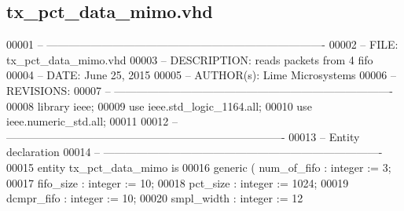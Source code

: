 \subsection{tx\+\_\+pct\+\_\+data\+\_\+mimo.\+vhd}
\label{tx__pct__data__mimo_8vhd_source}

\begin{DoxyCode}
00001 \textcolor{keyword}{-- ---------------------------------------------------------------------------- }
00002 \textcolor{keyword}{-- FILE:    tx\_pct\_data\_mimo.vhd}
00003 \textcolor{keyword}{-- DESCRIPTION: reads packets from 4 fifo}
00004 \textcolor{keyword}{-- DATE:    June 25, 2015}
00005 \textcolor{keyword}{-- AUTHOR(s):   Lime Microsystems}
00006 \textcolor{keyword}{-- REVISIONS:}
00007 \textcolor{keyword}{-- ---------------------------------------------------------------------------- }
00008 \textcolor{vhdlkeyword}{library }\textcolor{keywordflow}{ieee};
00009 \textcolor{vhdlkeyword}{use }ieee.std\_logic\_1164.\textcolor{keywordflow}{all};
00010 \textcolor{vhdlkeyword}{use }ieee.numeric\_std.\textcolor{keywordflow}{all};
00011 
00012 \textcolor{keyword}{-- ----------------------------------------------------------------------------}
00013 \textcolor{keyword}{-- Entity declaration}
00014 \textcolor{keyword}{-- ----------------------------------------------------------------------------}
00015 \textcolor{keywordflow}{entity }tx_pct_data_mimo \textcolor{keywordflow}{is}
00016   \textcolor{keywordflow}{generic} \textcolor{vhdlchar}{(} \textcolor{vhdlchar}{num_of_fifo} \textcolor{vhdlchar}{:} \textcolor{comment}{integer} \textcolor{vhdlchar}{:=} \textcolor{vhdllogic}{}\textcolor{vhdllogic}{3};
00017             \textcolor{vhdlchar}{fifo_size}   \textcolor{vhdlchar}{:} \textcolor{comment}{integer} \textcolor{vhdlchar}{:=} \textcolor{vhdllogic}{}\textcolor{vhdllogic}{10};
00018             \textcolor{vhdlchar}{pct_size}    \textcolor{vhdlchar}{:} \textcolor{comment}{integer} \textcolor{vhdlchar}{:=} \textcolor{vhdllogic}{}\textcolor{vhdllogic}{1024};
00019             \textcolor{vhdlchar}{dcmpr_fifo}  \textcolor{vhdlchar}{:} \textcolor{comment}{integer} \textcolor{vhdlchar}{:=} \textcolor{vhdllogic}{}\textcolor{vhdllogic}{10};
00020             \textcolor{vhdlchar}{smpl_width}  \textcolor{vhdlchar}{:} \textcolor{comment}{integer} \textcolor{vhdlchar}{:=} \textcolor{vhdllogic}{}\textcolor{vhdllogic}{12}  

\end{DoxyCode}

